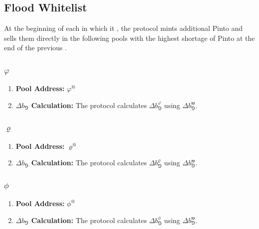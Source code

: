 \documentclass[class=article, crop=false]{standalone}
\begin{document}

\subsection{Flood Whitelist}

At the beginning of each  in which it , the protocol mints additional Pinto and sells them directly in the following pools with the highest shortage of Pinto at the end of the previous .


\subsubsection{$\varphi$}

\begin{enumerate}
    \item \textbf{Pool Address:} $\varphi^{@}$
    \item \textbf{$\Delta b_{\Game}$ Calculation:} The protocol calculates $\Delta b_{\Game}^{\varphi}$ using $\Delta b_{\Game}^{\mathfrak{w}}$.
\end{enumerate}


\subsubsection{$\varrho$}

\begin{enumerate}
    \item \textbf{Pool Address:} $\varrho^{@}$
    \item \textbf{$\Delta b_{\Game}$ Calculation:} The protocol calculates $\Delta b_{\Game}^{\varrho}$ using $\Delta b_{\Game}^{\mathfrak{w}}$.
\end{enumerate}


\subsubsection{$\phi$}

\begin{enumerate}
    \item \textbf{Pool Address:} $\phi^{@}$
    \item \textbf{$\Delta b_{\Game}$ Calculation:} The protocol calculates $\Delta b_{\Game}^{\phi}$ using $\Delta b_{\Game}^{\mathfrak{w}}$.
\end{enumerate}
\end{document}
